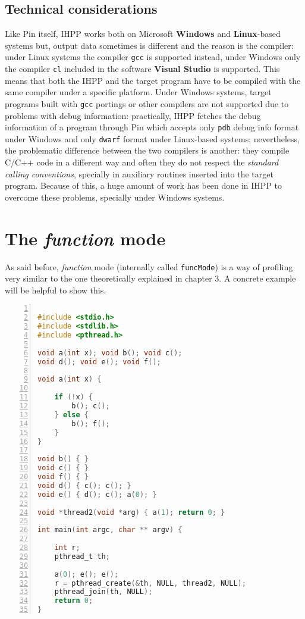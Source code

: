 \documentclass[a4paper,10pt]{report}
\begin{document}
\subsection{Technical considerations}

Like Pin itself, IHPP works both on Microsoft \textbf{Windows} and \textbf{Linux}-based systems but, output data sometimes is different and the reason is the compiler:
under Linux systems the compiler \verb|gcc| is supported instead, under Windows only the compiler \verb|cl| included in the software \textbf{Visual Studio} is supported.
This means that both the IHPP and the target program have to be compiled with the same compiler under a specific platform. Under Windows systems, target programs built with \verb|gcc| portings or other compilers are not supported due to problems with debug information:
practically, IHPP fetches the debug information of a program through Pin which accepts only \verb|pdb| debug info format under Windows and only \verb|dwarf| format under Linux-based systems; nevertheless, the problematic difference between the two compilers is another:
they compile C/C++ code in a different way and often they do not respect the \emph{standard calling conventions}, specially in auxiliary routines inserted into the target program.
Because of this, a huge amount of work has been done in IHPP to overcome these problems,
specially under Windows systems.

\section{The \emph{function} mode}

As said before, \emph{function} mode (internally called \verb|funcMode|)
is a way of profiling very similar to the one theoretically explained in chapter 3.
A concrete example will be helpful to show this.

\begin{lstlisting}[language=C,
	caption={prog1.c, a simple multi-threaded program},
	label=prog1, frame=leftline, numbers=left]

#include <stdio.h>
#include <stdlib.h>
#include <pthread.h>

void a(int x); void b(); void c();
void d(); void e(); void f();

void a(int x) {

	if (!x) {
		b(); c();
	} else {
		b(); f();
	}
}

void b() { }
void c() { }
void f() { }
void d() { c(); c(); }
void e() { d(); c(); a(0); }

void *thread2(void *arg) { a(1); return 0; }

int main(int argc, char ** argv) {

	int r;
	pthread_t th;

	a(0); e(); e();
	r = pthread_create(&th, NULL, thread2, NULL);
	pthread_join(th, NULL);
	return 0;
}

\end{lstlisting}
\end{document}
